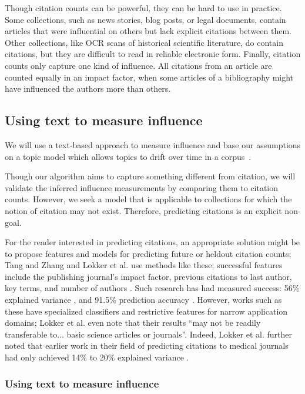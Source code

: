 Though citation counts can be powerful, they can be hard to use in
practice.  Some collections, such as news stories, blog posts, or
legal documents, contain articles that were influential on others but
lack explicit citations between them.  Other collections, like OCR
scans of historical scientific literature, do contain citations, but
they are difficult to read in reliable electronic form.  Finally,
citation counts only capture one kind of influence.  All citations
from an article are counted equally in an impact factor, when some
articles of a bibliography might have influenced the authors more than
others.

\subsection*{Using text to measure influence}

We will use a text-based approach to measure influence and base our
assumptions on a topic model which allows topics to drift over time in
a corpus~\cite{blei:2006}.

Though our algorithm aims to capture something different from
citation, we will validate the inferred influence measurements by
comparing them to citation counts.  However, we seek a model that is
applicable to collections for which the notion of citation may not
exist.  Therefore, predicting citations is an explicit non-goal. 

For the reader interested in predicting citations, an appropriate
solution might be to propose features and models for predicting future
or heldout citation counts; Tang and Zhang \cite{tang:2009} and Lokker
et al. \cite{lokker:2008} use methods like these; successful features
include the publishing journal's impact factor, previous citations to
last author, key terms, and number of authors
\cite{tang:2009,lokker:2008}.  Such research has had measured success:
56\% explained variance \cite{lokker:2008}, and 91.5\% prediction
accuracy \cite{ibanez:2009}.  However, works such as these have
specialized classifiers and restrictive features for narrow
application domains; Lokker et al. \cite{lokker:2008} even note that
their results ``may not be readily transferable to... basic science
articles or journals''. Indeed, Lokker et al.  further noted that
earlier work in their field of predicting citations to medical
journals had only achieved 14\% to 20\% explained variance
\cite{lokker:2008}.

\subsubsection*{Using text to measure influence}

